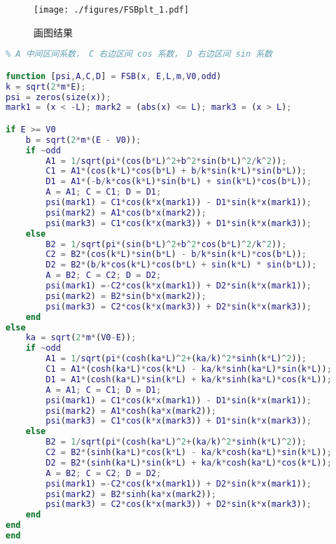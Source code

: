 
\begin{issues}
\issueDraft
\end{issues}


\begin{figure}[ht]
\centering
\texttt{[image: ./figures/FSBplt\_1.pdf]}
\caption{画图结果} \label{FSBplt_fig1}
\end{figure}

\begin{lstlisting}[language=matlab, caption=FSB.m]
% m 质量，V0 势垒，E 能量， L 势垒半宽， odd 奇函数 true 偶函数 false
% A 中间区间系数， C 右边区间 cos 系数， D 右边区间 sin 系数

function [psi,A,C,D] = FSB(x, E,L,m,V0,odd)
k = sqrt(2*m*E);
psi = zeros(size(x));
mark1 = (x < -L); mark2 = (abs(x) <= L); mark3 = (x > L);

if E >= V0
    b = sqrt(2*m*(E - V0));
    if ~odd
        A1 = 1/sqrt(pi*(cos(b*L)^2+b^2*sin(b*L)^2/k^2));
        C1 = A1*(cos(k*L)*cos(b*L) + b/k*sin(k*L)*sin(b*L));
        D1 = A1*(-b/k*cos(k*L)*sin(b*L) + sin(k*L)*cos(b*L));
        A = A1; C = C1; D = D1;
        psi(mark1) = C1*cos(k*x(mark1)) - D1*sin(k*x(mark1));
        psi(mark2) = A1*cos(b*x(mark2));
        psi(mark3) = C1*cos(k*x(mark3)) + D1*sin(k*x(mark3));
    else
        B2 = 1/sqrt(pi*(sin(b*L)^2+b^2*cos(b*L)^2/k^2));
        C2 = B2*(cos(k*L)*sin(b*L) - b/k*sin(k*L)*cos(b*L));
        D2 = B2*(b/k*cos(k*L)*cos(b*L) + sin(k*L) * sin(b*L));
        A = B2; C = C2; D = D2;
        psi(mark1) =-C2*cos(k*x(mark1)) + D2*sin(k*x(mark1));
        psi(mark2) = B2*sin(b*x(mark2));
        psi(mark3) = C2*cos(k*x(mark3)) + D2*sin(k*x(mark3));
    end
else
    ka = sqrt(2*m*(V0-E));
    if ~odd
        A1 = 1/sqrt(pi*(cosh(ka*L)^2+(ka/k)^2*sinh(k*L)^2));
        C1 = A1*(cosh(ka*L)*cos(k*L) - ka/k*sinh(ka*L)*sin(k*L));
        D1 = A1*(cosh(ka*L)*sin(k*L) + ka/k*sinh(ka*L)*cos(k*L));
        A = A1; C = C1; D = D1;
        psi(mark1) = C1*cos(k*x(mark1)) - D1*sin(k*x(mark1));
        psi(mark2) = A1*cosh(ka*x(mark2));
        psi(mark3) = C1*cos(k*x(mark3)) + D1*sin(k*x(mark3));
    else
        B2 = 1/sqrt(pi*(cosh(ka*L)^2+(ka/k)^2*sinh(k*L)^2));
        C2 = B2*(sinh(ka*L)*cos(k*L) - ka/k*cosh(ka*L)*sin(k*L));
        D2 = B2*(sinh(ka*L)*sin(k*L) + ka/k*cosh(ka*L)*cos(k*L));
        A = B2; C = C2; D = D2;
        psi(mark1) =-C2*cos(k*x(mark1)) + D2*sin(k*x(mark1));
        psi(mark2) = B2*sinh(ka*x(mark2));
        psi(mark3) = C2*cos(k*x(mark3)) + D2*sin(k*x(mark3));
    end
end
end
\end{lstlisting}

